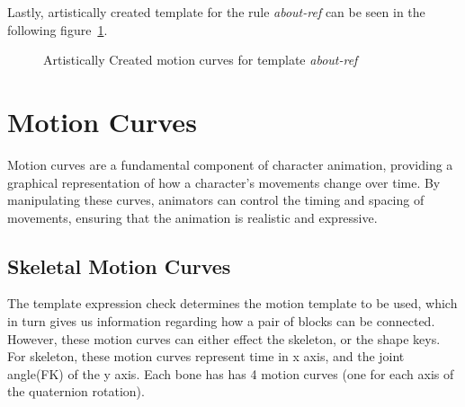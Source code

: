 \documentclass[../../main.tex]{subfiles}
\begin{document}
Lastly, artistically created template for the rule \emph{about-ref} can be seen in the following figure~\ref{fig:motion_curves_template_artist}.

\begin{figure}
     \centering
    \caption{Artistically Created motion curves for template \emph{about-ref}}
    \label{fig:motion_curves_template_artist}
\end{figure}

\section{Motion Curves}
\label{ch:intermediate_blocks_pose_correction:curves}

Motion curves are a fundamental component of character animation, providing a graphical representation of how a character's movements change over time. By manipulating these curves, animators can control the timing and spacing of movements, ensuring that the animation is realistic and expressive.

\subsection{Skeletal Motion Curves}
\label{ch:intermediate_blocks_pose_correction:curves:skeletal}

The template expression check determines the motion template to be used, which in turn gives us information regarding how a pair of blocks can be connected. However, these motion curves can either effect the skeleton, or the shape keys. For skeleton, these motion curves represent time in x axis, and the joint angle(FK) of the y axis. Each bone has has 4 motion curves (one for each axis of the quaternion rotation).
\end{document}
